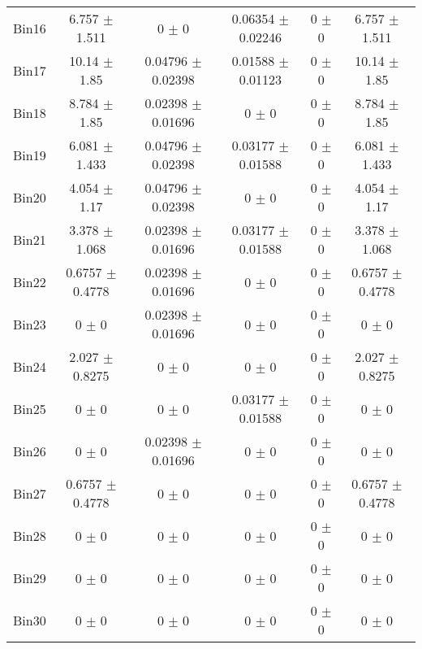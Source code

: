 \begin{tabular}{@{\extracolsep{4pt}}lccccc@{}}
     Bin16 & 6.757 $\pm$ 1.511 & 0 $\pm$ 0 & 0.06354 $\pm$ 0.02246 & 0 $\pm$ 0 & 6.757 $\pm$ 1.511 \\ 
     Bin17 & 10.14 $\pm$ 1.85 & 0.04796 $\pm$ 0.02398 & 0.01588 $\pm$ 0.01123 & 0 $\pm$ 0 & 10.14 $\pm$ 1.85 \\ 
     Bin18 & 8.784 $\pm$ 1.85 & 0.02398 $\pm$ 0.01696 & 0 $\pm$ 0 & 0 $\pm$ 0 & 8.784 $\pm$ 1.85 \\ 
     Bin19 & 6.081 $\pm$ 1.433 & 0.04796 $\pm$ 0.02398 & 0.03177 $\pm$ 0.01588 & 0 $\pm$ 0 & 6.081 $\pm$ 1.433 \\ 
     Bin20 & 4.054 $\pm$ 1.17 & 0.04796 $\pm$ 0.02398 & 0 $\pm$ 0 & 0 $\pm$ 0 & 4.054 $\pm$ 1.17 \\ 
     Bin21 & 3.378 $\pm$ 1.068 & 0.02398 $\pm$ 0.01696 & 0.03177 $\pm$ 0.01588 & 0 $\pm$ 0 & 3.378 $\pm$ 1.068 \\ 
     Bin22 & 0.6757 $\pm$ 0.4778 & 0.02398 $\pm$ 0.01696 & 0 $\pm$ 0 & 0 $\pm$ 0 & 0.6757 $\pm$ 0.4778 \\ 
     Bin23 & 0 $\pm$ 0 & 0.02398 $\pm$ 0.01696 & 0 $\pm$ 0 & 0 $\pm$ 0 & 0 $\pm$ 0 \\ 
     Bin24 & 2.027 $\pm$ 0.8275 & 0 $\pm$ 0 & 0 $\pm$ 0 & 0 $\pm$ 0 & 2.027 $\pm$ 0.8275 \\ 
     Bin25 & 0 $\pm$ 0 & 0 $\pm$ 0 & 0.03177 $\pm$ 0.01588 & 0 $\pm$ 0 & 0 $\pm$ 0 \\ 
     Bin26 & 0 $\pm$ 0 & 0.02398 $\pm$ 0.01696 & 0 $\pm$ 0 & 0 $\pm$ 0 & 0 $\pm$ 0 \\ 
     Bin27 & 0.6757 $\pm$ 0.4778 & 0 $\pm$ 0 & 0 $\pm$ 0 & 0 $\pm$ 0 & 0.6757 $\pm$ 0.4778 \\ 
     Bin28 & 0 $\pm$ 0 & 0 $\pm$ 0 & 0 $\pm$ 0 & 0 $\pm$ 0 & 0 $\pm$ 0 \\ 
     Bin29 & 0 $\pm$ 0 & 0 $\pm$ 0 & 0 $\pm$ 0 & 0 $\pm$ 0 & 0 $\pm$ 0 \\ 
     Bin30 & 0 $\pm$ 0 & 0 $\pm$ 0 & 0 $\pm$ 0 & 0 $\pm$ 0 & 0 $\pm$ 0 \\ 
\hline\hline
  \end{tabular}
